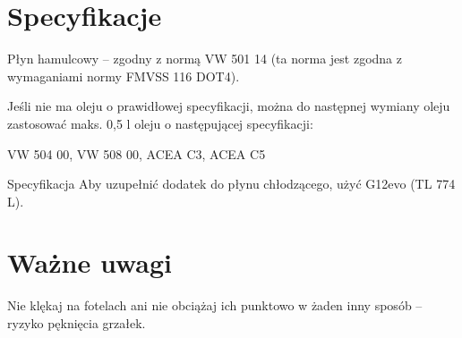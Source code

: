 \section{Specyfikacje}

Płyn hamulcowy -- zgodny z normą VW 501 14 (ta norma jest zgodna z wymaganiami normy FMVSS 116 DOT4).

Jeśli nie ma oleju o prawidłowej specyfikacji, można do następnej wymiany oleju zastosować maks. 0,5 l oleju o następującej specyfikacji:
\begin{itemizeTriangle}
	\itemTriangle VW 504 00, VW 508 00, ACEA C3, ACEA C5
\end{itemizeTriangle}

Specyfikacja
Aby uzupełnić dodatek do płynu chłodzącego, użyć G12evo (TL 774 L).


\section{Ważne uwagi}

\begin{itemizeTriangle}
	\itemTriangle Nie klękaj na fotelach ani nie obciążaj ich punktowo w żaden inny sposób -- ryzyko pęknięcia grzałek.
\end{itemizeTriangle}



